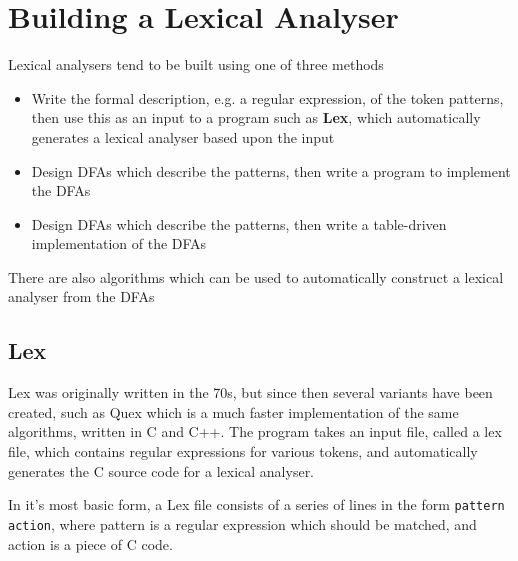 \section*{Building a Lexical Analyser}

Lexical analysers tend to be built using one of three methods
\begin{itemize}
  \item Write the formal description, e.g. a regular expression, of the token patterns, then use this as an input to
   a program such as \textbf{Lex}, which automatically generates a lexical analyser based upon the input
  \item Design DFAs which describe the patterns, then write a program to implement the DFAs
  \item Design DFAs which describe the patterns, then write a table-driven implementation of the DFAs
\end{itemize}
There are also algorithms which can be used to automatically construct a lexical analyser from the DFAs

\subsection*{Lex}

Lex was originally written in the 70s, but since then several variants have been created, such as Quex which is a much
 faster implementation of the same algorithms, written in C and C++. The program takes an input file, called a lex file,
 which contains regular expressions for various tokens, and automatically generates the C source code for a lexical
 analyser.

In it's most basic form, a Lex file consists of a series of lines in the form \verb`pattern action`, where pattern is a
 regular expression which should be matched, and action is a piece of C code.